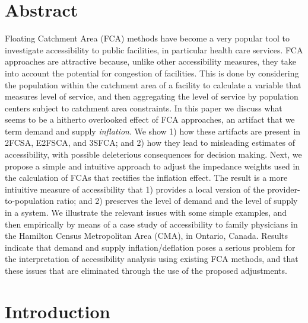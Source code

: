 \documentclass[10pt,letterpaper]{article}
\begin{document}
\section*{Abstract}
Floating Catchment Area (FCA) methods have become a very popular tool to
investigate accessibility to public facilities, in particular health
care services. FCA approaches are attractive because, unlike other
accessibility measures, they take into account the potential for
congestion of facilities. This is done by considering the population
within the catchment area of a facility to calculate a variable that
measures level of service, and then aggregating the level of service by
population centers subject to catchment area constraints. In this paper
we discuss what seems to be a hitherto overlooked effect of FCA
approaches, an artifact that we term demand and supply \emph{inflation}.
We show 1) how these artifacts are present in 2FCSA, E2FSCA, and 3SFCA;
and 2) how they lead to misleading estimates of accessibility, with
possible deleterious consequences for decision making. Next, we propose
a simple and intuitive approach to adjust the impedance weights used in
the calculation of FCAs that rectifies the inflation effect. The result
is a more intiuitive measure of accessibility that 1) provides a local
version of the provider-to-population ratio; and 2) preserves the level
of demand and the level of supply in a system. We illustrate the
relevant issues with some simple examples, and then empirically by means
of a case study of accessibility to family physicians in the Hamilton
Census Metropolitan Area (CMA), in Ontario, Canada. Results indicate
that demand and supply inflation/deflation poses a serious problem for
the interpretation of accessibility analysis using existing FCA methods,
and that these issues that are eliminated through the use of the
proposed adjustments.


\linenumbers

\section{Introduction}\label{introduction}
\end{document}
